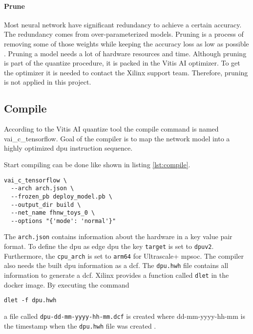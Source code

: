 \paragraph{Prune}
Most neural network have significant redundancy to achieve a certain accuracy.
The redundancy comes from over-parameterized models.
Pruning is a process of removing some of those weights while keeping the accuracy loss as low as possible \cite{pruning_overview}.
Pruning a model needs a lot of hardware resources and time.
Although pruning is part of the quantize procedure, it is packed in the Vitis AI optimizer.
To get the optimizer it is needed to contact the Xilinx support team.
Therefore, pruning is not applied in this project.

\subsection{Compile}
\label{subsec:embedded_platform:model_deployment:compile}
According to the Vitis AI quantize tool the compile command is named vai\_c\_tensorflow.
Goal of the compiler is to map the network model into a highly optimized \acrshort{dpu} instruction sequence.

Start compiling can be done like shown in listing \ref{lst:compile}.

\begin{lstlisting}[style=bash, caption={Compile command}, label=lst:compile]
  vai_c_tensorflow \
  --arch arch.json \
  --frozen_pb deploy_model.pb \
  --output_dir build \
  --net_name fhnw_toys_0 \
  --options "{'mode': 'normal'}"
\end{lstlisting}

The \texttt{arch.json} contains information about the hardware in a key value pair format.
To define the \acrshort{dpu} as edge \acrshort{dpu} the key \texttt{target} is set to \texttt{dpuv2}.
Furthermore, the \texttt{cpu\_arch} is set to \texttt{arm64} for Ultrascale+ \acrshort{mpsoc}.
The compiler also needs the built \acrshort{dpu} information as a \acrfull{dcf}.
The \texttt{dpu.hwh} file contains all information to generate a \acrshort{dcf}.
Xilinx provides a function called \texttt{dlet} in the docker image.
By executing the command
\begin{lstlisting}[style=bash, caption={}, label=lst:dlet]
  dlet -f dpu.hwh
\end{lstlisting}
a file called \texttt{dpu-dd-mm-yyyy-hh-mm.dcf} is created where dd-mm-yyyy-hh-mm is the timestamp when the \texttt{dpu.hwh} file was created \cite{vitis_ai_user_guide}.

